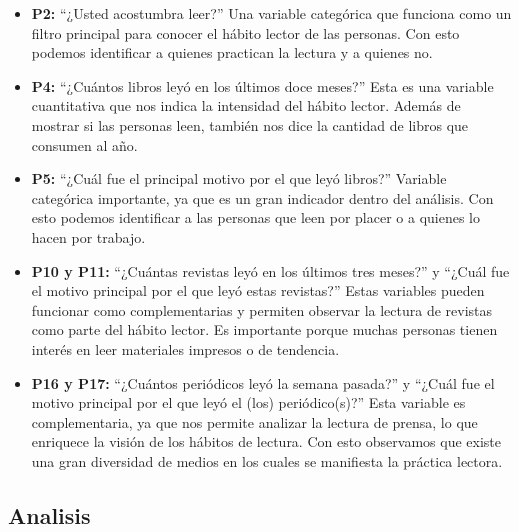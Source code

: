 \documentclass[aps,reprint]{revtex4-2}
\begin{document}
\begin{itemize}
    \item \textbf{P2:} ``¿Usted acostumbra leer?'' Una variable categórica que funciona como un filtro principal para conocer el hábito lector de las personas. Con esto podemos identificar a quienes practican la lectura y a quienes no.

    \item \textbf{P4:} ``¿Cuántos libros leyó en los últimos doce meses?'' Esta es una variable cuantitativa que nos indica la intensidad del hábito lector. Además de mostrar si las personas leen, también nos dice la cantidad de libros que consumen al año.

    \item \textbf{P5:} ``¿Cuál fue el principal motivo por el que leyó libros?'' Variable categórica importante, ya que es un gran indicador dentro del análisis. Con esto podemos identificar a las personas que leen por placer o a quienes lo hacen por trabajo.

    \item \textbf{P10 y P11:} ``¿Cuántas revistas leyó en los últimos tres meses?'' y ``¿Cuál fue el motivo principal por el que leyó estas revistas?'' Estas variables pueden funcionar como complementarias y permiten observar la lectura de revistas como parte del hábito lector. Es importante porque muchas personas tienen interés en leer materiales impresos o de tendencia.

    \item \textbf{P16 y P17:} ``¿Cuántos periódicos leyó la semana pasada?'' y ``¿Cuál fue el motivo principal por el que leyó el (los) periódico(s)?'' Esta variable es complementaria, ya que nos permite analizar la lectura de prensa, lo que enriquece la visión de los hábitos de lectura. Con esto observamos que existe una gran diversidad de medios en los cuales se manifiesta la práctica lectora.
\end{itemize}
\subsection{Analisis}
\end{document}
